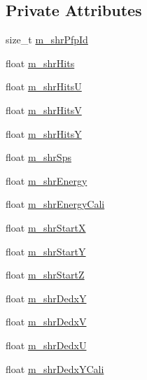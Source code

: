 \subsection*{Private Attributes}
\begin{DoxyCompactItemize}
\item 
size\-\_\-t \hyperlink{classselection_1_1CCincSelection_ad792c1259135d226df875d1150776ce9}{m\-\_\-shr\-Pfp\-Id}
\item 
float \hyperlink{classselection_1_1CCincSelection_a964f3aac8e99293d36792be15e9f2816}{m\-\_\-shr\-Hits}
\item 
float \hyperlink{classselection_1_1CCincSelection_a838d15088def4e962fdd1b664c5960e1}{m\-\_\-shr\-Hits\-U}
\item 
float \hyperlink{classselection_1_1CCincSelection_a35d27e317a7c161b6051fde267d08850}{m\-\_\-shr\-Hits\-V}
\item 
float \hyperlink{classselection_1_1CCincSelection_a5df838908bc1b3428f0c8c50209f4f0d}{m\-\_\-shr\-Hits\-Y}
\item 
float \hyperlink{classselection_1_1CCincSelection_a674a7e5b50475f3afa692bc7a47f5f22}{m\-\_\-shr\-Sps}
\item 
float \hyperlink{classselection_1_1CCincSelection_a2650ff351a7a6589c2b6ff9f701da321}{m\-\_\-shr\-Energy}
\item 
float \hyperlink{classselection_1_1CCincSelection_adec1b19741776f6e33a88b4d0f2b6330}{m\-\_\-shr\-Energy\-Cali}
\item 
float \hyperlink{classselection_1_1CCincSelection_a692099d6cabdf30bfd269f35c3193971}{m\-\_\-shr\-Start\-X}
\item 
float \hyperlink{classselection_1_1CCincSelection_a60b711d11ef5b1ce99992df868e900c7}{m\-\_\-shr\-Start\-Y}
\item 
float \hyperlink{classselection_1_1CCincSelection_ac97b3d4c8f1dff8f692de9fc2c9f585c}{m\-\_\-shr\-Start\-Z}
\item 
float \hyperlink{classselection_1_1CCincSelection_aca70f9a6dfad2d0ed4c2ef4c71fe37bd}{m\-\_\-shr\-Dedx\-Y}
\item 
float \hyperlink{classselection_1_1CCincSelection_a2d1f501922cf14e3d1f6fb8cc8e63173}{m\-\_\-shr\-Dedx\-V}
\item 
float \hyperlink{classselection_1_1CCincSelection_a8874fb100e151832807ab459419e69d3}{m\-\_\-shr\-Dedx\-U}
\item 
float \hyperlink{classselection_1_1CCincSelection_a1b1d664e4bcff3d9e4d10596ca5039d2}{m\-\_\-shr\-Dedx\-Y\-Cali}
\item 

\end{DoxyCompactItemize}
